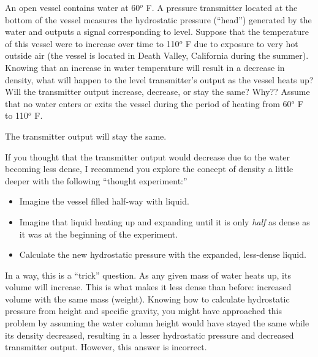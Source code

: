 

An open vessel contains water at 60$^{o}$ F.  A pressure transmitter located at the bottom of the vessel measures the hydrostatic pressure (``head'') generated by the water and outputs a signal corresponding to level.  Suppose that the temperature of this vessel were to increase over time to 110$^{o}$ F due to exposure to very hot outside air (the vessel is located in Death Valley, California during the summer).  Knowing that an increase in water temperature will result in a decrease in density, what will happen to the level transmitter's output as the vessel heats up?  Will the transmitter output increase, decrease, or stay the same?  Why??  Assume that no water enters or exits the vessel during the period of heating from 60$^{o}$ F to 110$^{o}$ F.







The transmitter output will stay the same.  

\vskip 10pt

If you thought that the transmitter output would decrease due to the water becoming less dense, I recommend you explore the concept of density a little deeper with the following ``thought experiment:''

\begin{itemize}
\item{} Imagine the vessel filled half-way with liquid.
\item{} Imagine that liquid heating up and expanding until it is only {\it half} as dense as it was at the beginning of the experiment.
\item{} Calculate the new hydrostatic pressure with the expanded, less-dense liquid.
\end{itemize}

In a way, this is a ``trick'' question.  As any given mass of water heats up, its volume will increase.  This is what makes it less dense than before: increased volume with the same mass (weight).  Knowing how to calculate hydrostatic pressure from height and specific gravity, you might have approached this problem by assuming the water column height would have stayed the same while its density decreased, resulting in a lesser hydrostatic pressure and decreased transmitter output.  However, this answer is incorrect.

